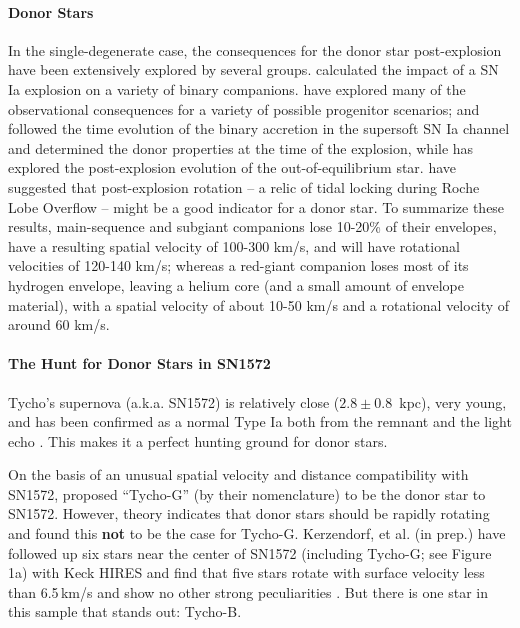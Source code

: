 \documentclass[12pt]{article}
\begin{document}
\paragraph{Donor Stars}
In the single-degenerate case, the consequences for the donor star post-explosion have been extensively explored by several groups. \citet{2000ApJS..128..615M} calculated the impact of a SN Ia explosion on a variety of binary companions. \citet{2001ApJ...550L..53C} have explored many of the observational consequences for a variety of possible progenitor scenarios; \citet{2004MNRAS.350.1301H} and \citet{Han:2008p726} followed the time evolution of the binary accretion in the supersoft SN Ia channel and determined the donor properties at the time of the explosion, while \citet{2003astro.ph..3660P} has explored the post-explosion evolution of the out-of-equilibrium star. \citet{2009ApJ...701.1665K} have suggested that post-explosion rotation -- a relic of tidal locking during Roche Lobe Overflow -- might be a good indicator for a donor star. 
To summarize these results, main-sequence and subgiant companions lose 10-20\% of their envelopes,  have a resulting spatial velocity of 100-300 km/s, and will have rotational velocities of 120-140 km/s; whereas a red-giant companion loses most of its hydrogen envelope, leaving a helium core (and a small amount of envelope material), with a spatial velocity of about 10-50 km/s and a rotational velocity of around 60 km/s.

\vspace{-5mm}
\paragraph{The Hunt for Donor Stars in SN1572}
Tycho's supernova (a.k.a. SN1572) is relatively close ($2.8\pm0.8$~kpc), very young, and has been confirmed as a normal Type Ia both from the remnant \citep{2006ApJ...645.1373B} and the light echo \citep{2008ApJ...681L..81R,2008Natur.456..617K}. This makes it a perfect hunting ground for donor stars.

On the basis of an unusual spatial velocity and distance compatibility with SN1572, \citet{2004Natur.431.1069R} proposed ``Tycho-G'' (by their nomenclature) to be the donor star to SN1572.  However, theory indicates that donor stars should be rapidly rotating and \citet{2009ApJ...701.1665K} found this {\bf not} to be the case for Tycho-G. Kerzendorf, et al.  (in prep.) have followed up six stars  near the center of SN1572 (including Tycho-G; see Figure 1a) with Keck HIRES  and find that five stars rotate with surface velocity less than 6.5\,km/s and show no other strong peculiarities . But there is one star in this sample that stands out: Tycho-B.
\end{document}
